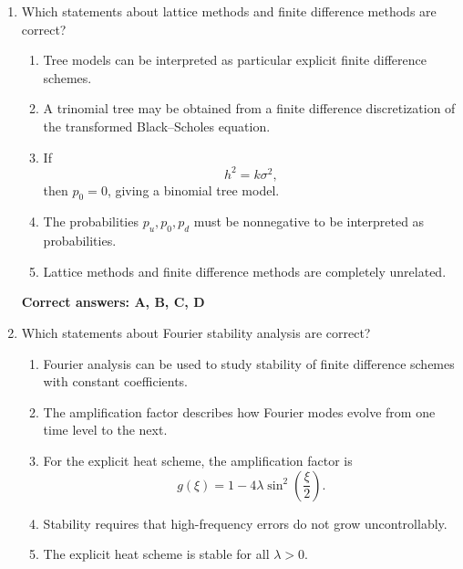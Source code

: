 \documentclass[a4paper,12pt]{article}
\begin{document}
\begin{enumerate}
\begin{enumerate}[label=(\arabic*)]
\textbf{Correct answers: A, B, C, D}
\item Which statements about lattice methods and finite difference methods are correct?

\begin{enumerate}[label=\Alph*.]
    \item Tree models can be interpreted as particular explicit finite difference schemes.
    \item A trinomial tree may be obtained from a finite difference discretization of the transformed Black--Scholes equation.
    \item If
    \[
    h^2=k\sigma^2,
    \]
    then \(p_0=0\), giving a binomial tree model.
    \item The probabilities \(p_u,p_0,p_d\) must be nonnegative to be interpreted as probabilities.
    \item Lattice methods and finite difference methods are completely unrelated.
\end{enumerate}

\textbf{Correct answers: A, B, C, D}
\item Which statements about Fourier stability analysis are correct?

\begin{enumerate}[label=\Alph*.]
    \item Fourier analysis can be used to study stability of finite difference schemes with constant coefficients.
    \item The amplification factor describes how Fourier modes evolve from one time level to the next.
    \item For the explicit heat scheme, the amplification factor is
    \[
    g(\xi)=1-4\lambda\sin^2\left(\frac{\xi}{2}\right).
    \]
    \item Stability requires that high-frequency errors do not grow uncontrollably.
    \item The explicit heat scheme is stable for all \(\lambda>0\).
\end{enumerate}


\end{enumerate}
\end{enumerate}
\end{document}
